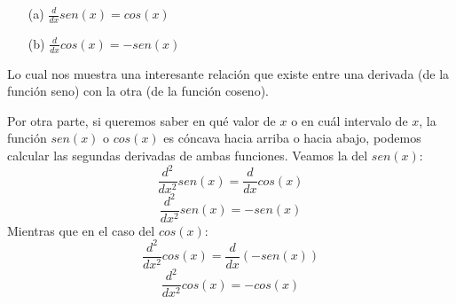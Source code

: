 \documentclass[12pt]{article}
\begin{document}
\begin{enumerate}
\item[(a)] $\frac{d}{dx} sen(x) = cos(x)$
\item[(b)] $\frac{d}{dx} cos(x) = -sen(x)$
\end{enumerate}

Lo cual nos muestra una interesante relación que existe entre una derivada (de la función seno) con la otra (de la función coseno).

Por otra parte, si queremos saber en qué valor de $x$ o en cuál intervalo de $x$, la función $sen(x)$ o $cos(x)$ es cóncava hacia arriba o hacia abajo, podemos calcular las segundas derivadas de ambas funciones. Veamos la del $sen(x)$:
\[\frac{d^{2}}{dx^{2}} sen(x) = \frac{d}{dx} cos(x)\]
\[\frac{d^{2}}{dx^{2}} sen(x) = -sen(x)\]
Mientras que en el caso del $cos(x)$:
\[\frac{d^{2}}{dx^{2}} cos(x) = \frac{d}{dx} (-sen(x))\]
\[\frac{d^{2}}{dx^{2}} cos(x) = -cos(x)\]
\end{document}
